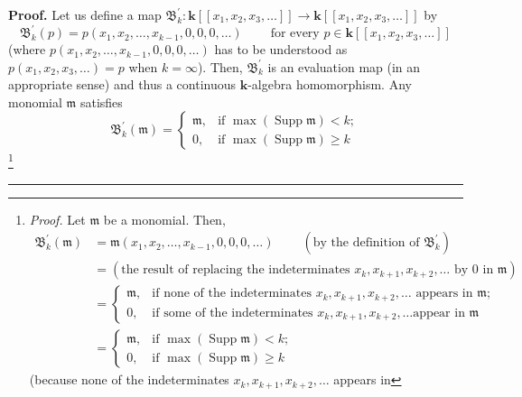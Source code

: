 \documentclass
[numbers=enddot,12pt,final,onecolumn,notitlepage,abstracton]{scrartcl}%
\theoremstyle{definition}
\newenvironment{proof}[1][Proof]{\noindent\textbf{#1.} }{\ \rule{0.5em}{0.5em}}
\newenvironment{verlong}{}{}
\begin{document}
\begin{verlong}
\begin{proof}
Let us define a map $\mathfrak{B}_{k}^{\prime}:\mathbf{k}\left[  \left[
x_{1},x_{2},x_{3},\ldots\right]  \right]  \rightarrow\mathbf{k}\left[  \left[
x_{1},x_{2},x_{3},\ldots\right]  \right]  $ by%
\[
\mathfrak{B}_{k}^{\prime}\left(  p\right)  =p\left(  x_{1},x_{2}%
,\ldots,x_{k-1},0,0,0,\ldots\right)  \ \ \ \ \ \ \ \ \ \ \text{for every }%
p\in\mathbf{k}\left[  \left[  x_{1},x_{2},x_{3},\ldots\right]  \right]
\]
(where $p\left(  x_{1},x_{2},\ldots,x_{k-1},0,0,0,\ldots\right)  $ has to be
understood as $p\left(  x_{1},x_{2},x_{3},\ldots\right)  =p$ when $k=\infty$).
Then, $\mathfrak{B}_{k}^{\prime}$ is an evaluation map (in an appropriate
sense) and thus a continuous $\mathbf{k}$-algebra homomorphism. Any monomial
$\mathfrak{m}$ satisfies%
\begin{equation}
\mathfrak{B}_{k}^{\prime}\left(  \mathfrak{m}\right)  =
\begin{cases}
\mathfrak{m}, & \text{if }\max\left(  \operatorname*{Supp}\mathfrak{m}\right)
<k;\\
0, & \text{if }\max\left(  \operatorname*{Supp}\mathfrak{m}\right)  \geq k
\end{cases}
\label{pf.thm.tvidend.monom}%
\end{equation}
\footnote{\textit{Proof.} Let $\mathfrak{m}$ be a monomial. Then,%
\begin{align*}
\mathfrak{B}_{k}^{\prime}\left(  \mathfrak{m}\right)   &  =\mathfrak{m}\left(
x_{1},x_{2},\ldots,x_{k-1},0,0,0,\ldots\right)  \ \ \ \ \ \ \ \ \ \ \left(
\text{by the definition of }\mathfrak{B}_{k}^{\prime}\right) \\
&  =\left(  \text{the result of replacing the indeterminates }x_{k}%
,x_{k+1},x_{k+2},\ldots\text{ by }0\text{ in }\mathfrak{m}\right) \\
&  =
\begin{cases}
\mathfrak{m}, & \text{if none of the indeterminates }x_{k},x_{k+1}%
,x_{k+2},\ldots\text{ appears in }\mathfrak{m}\text{;}\\
0, & \text{if some of the indeterminates }x_{k},x_{k+1},x_{k+2},\ldots\text{
appear in }\mathfrak{m}%
\end{cases}
\\
&  =
\begin{cases}
\mathfrak{m}, & \text{if }\max\left(  \operatorname*{Supp}\mathfrak{m}\right)
<k;\\
0, & \text{if }\max\left(  \operatorname*{Supp}\mathfrak{m}\right)  \geq k
\end{cases}
\end{align*}
(because none of the indeterminates $x_{k},x_{k+1},x_{k+2},\ldots$ appears in
}
\end{proof}
\end{verlong}
\end{document}
